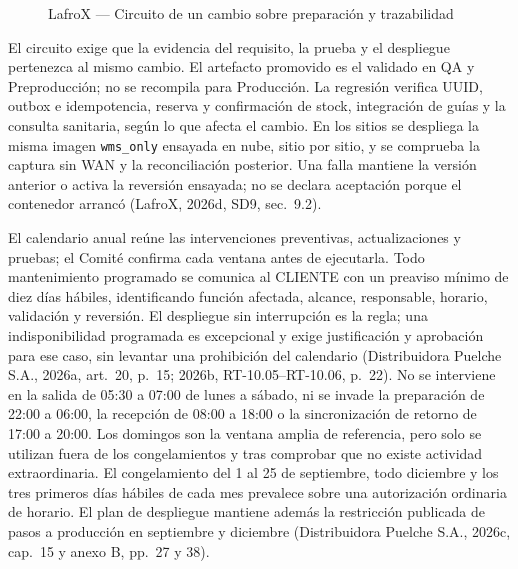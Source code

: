 \begin{figure}[H]
\centering

\caption{LafroX — Circuito de un cambio sobre preparación y trazabilidad}
\label{fig:sd11-cambio}
\end{figure}

El circuito exige que la evidencia del requisito, la prueba y el despliegue pertenezca al mismo cambio. El artefacto promovido es el validado en QA y Preproducción; no se recompila para Producción. La regresión verifica UUID, outbox e idempotencia, reserva y confirmación de stock, integración de guías y la consulta sanitaria, según lo que afecta el cambio. En los sitios se despliega la misma imagen \texttt{wms\_only} ensayada en nube, sitio por sitio, y se comprueba la captura sin WAN y la reconciliación posterior. Una falla mantiene la versión anterior o activa la reversión ensayada; no se declara aceptación porque el contenedor arrancó (LafroX, 2026d, SD9, sec.~9.2).

El calendario anual reúne las intervenciones preventivas, actualizaciones y pruebas; el Comité confirma cada ventana antes de ejecutarla. Todo mantenimiento programado se comunica al CLIENTE con un preaviso mínimo de diez días hábiles, identificando función afectada, alcance, responsable, horario, validación y reversión. El despliegue sin interrupción es la regla; una indisponibilidad programada es excepcional y exige justificación y aprobación para ese caso, sin levantar una prohibición del calendario (Distribuidora Puelche S.A., 2026a, art.~20, p.~15; 2026b, RT-10.05--RT-10.06, p.~22). No se interviene en la salida de 05:30 a 07:00 de lunes a sábado, ni se invade la preparación de 22:00 a 06:00, la recepción de 08:00 a 18:00 o la sincronización de retorno de 17:00 a 20:00. Los domingos son la ventana amplia de referencia, pero solo se utilizan fuera de los congelamientos y tras comprobar que no existe actividad extraordinaria. El congelamiento del 1 al 25 de septiembre, todo diciembre y los tres primeros días hábiles de cada mes prevalece sobre una autorización ordinaria de horario. El plan de despliegue mantiene además la restricción publicada de pasos a producción en septiembre y diciembre (Distribuidora Puelche S.A., 2026c, cap.~15 y anexo B, pp.~27 y 38).

